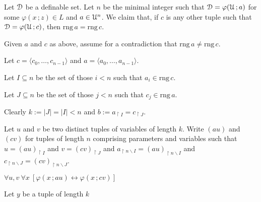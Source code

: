 \documentclass[10pt]{article}
\def\phi{\varphi}
\def\D{\EuScript D}
\def\U{\EuScript U}
\def\sm{\smallsetminus}
\def\<{\langle}
\def\>{\rangle}
\def\A{\forall}
\def\iff{\leftrightarrow}
\def\range{\textrm{rng}}
\newcounter{ex}
\begin{document}
Let $\D$ be a definable set.
%
Let $n$ be the minimal integer such that $\D=\phi(\U\,;a)$ for some $\phi(x\,;z)\in L$ and $a\in\U^n$.
%
We claim that, if $c$ is any other tuple such that $\D=\phi(\U\,;c)$, then $\range\, a=\range\, c$. 

Given $a$ and $c$ as above, assume for a contradiction that  $\range\, a\neq\range\, c$.

Let $c=\<c_0,\dots,c_{n-1}\>$ and $a=\<a_0,\dots,a_{n-1}\>$.

Let $I\subseteq n$ be the set of those $i<n$ such that $a_i\in\range\,c$.

Let $J\subseteq n$ be the set of those $j<n$ such that $c_j\in\range\,a$.

Clearly $k:=|J|=|I|<n$ and $b:=a_{\restriction I}=c_{\restriction J}$.

Let $u$ and $v$ be two distinct tuples of variables of length $k$. Write $(au)$ and $(cv)$ for tuples of length $n$ comprising parameters and variables such that $u=(au)_{\restriction I}$ and $v=(cv)_{\restriction J}$ and $a_{\restriction n\sm I}=(au)_{\restriction n\sm I}$ and $c_{\restriction n\sm J}=(cv)_{\restriction n\sm J}$.






$\A u,v\ \A x\ [\phi(x\,;au)\iff\phi(x\,;cv)]$




Let $y$ be a tuple of length $k$
\end{document}
